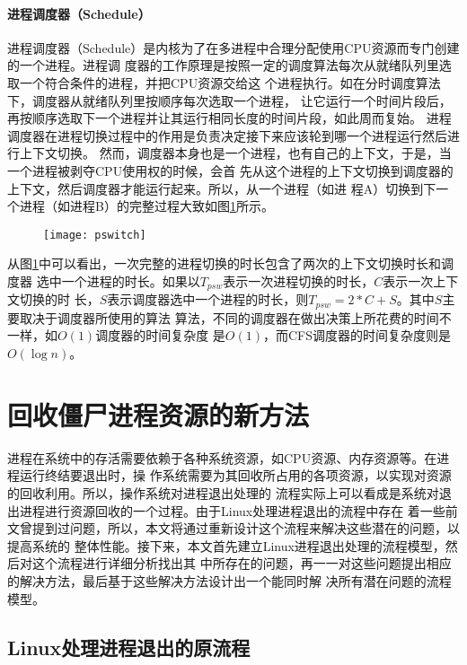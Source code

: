 \documentclass{swfuthesism}
\begin{document}
\subsubsection{进程调度器（Schedule）}

进程调度器（Schedule）是内核为了在多进程中合理分配使用CPU资源而专门创建的一个进程。进程调
度器的工作原理是按照一定的调度算法每次从就绪队列里选取一个符合条件的进程，并把CPU资源交给这
个进程执行\cite{rusling99tlk}。如在分时调度算法下，调度器从就绪队列里按顺序每次选取一个进程，
让它运行一个时间片段后，再按顺序选取下一个进程并让其运行相同长度的时间片段，如此周而复始。
进程调度器在进程切换过程中的作用是负责决定接下来应该轮到哪一个进程运行然后进行上下文切换。
然而，调度器本身也是一个进程，也有自己的上下文，于是，当一个进程被剥夺CPU使用权的时候，会首
先从这个进程的上下文切换到调度器的上下文，然后调度器才能运行起来。所以，从一个进程（如进
程A）切换到下一个进程（如进程B）的完整过程大致如图\ref{fig:sched5}所示。

\begin{figure}[hb]
  \centering
  \texttt{[image: pswitch]}
  \label{fig:sched5}
\end{figure}

从图\ref{fig:sched5}中可以看出，一次完整的进程切换的时长包含了两次的上下文切换时长和调度器
选中一个进程的时长。如果以$T_{psw}$表示一次进程切换的时长，$C$表示一次上下文切换的时
长，$S$表示调度器选中一个进程的时长，则$T_{psw}=2*C+S$。其中$S$主要取决于调度器所使用的算法
算法，不同的调度器在做出决策上所花费的时间不一样，如$O(1)$调度器的时间复杂度
是$O(1)$\cite{wiki:o1s}，而CFS调度器的时间复杂度则是$O(\log n)$\cite{wiki:cfs}。

\chapter{回收僵尸进程资源的新方法}

进程在系统中的存活需要依赖于各种系统资源，如CPU资源、内存资源等。在进程运行终结要退出时，操
作系统需要为其回收所占用的各项资源，以实现对资源的回收利用。所以，操作系统对进程退出处理的
流程实际上可以看成是系统对退出进程进行资源回收的一个过程。由于Linux处理进程退出的流程中存在
着一些前文曾提到过问题，所以，本文将通过重新设计这个流程来解决这些潜在的问题，以提高系统的
整体性能。接下来，本文首先建立Linux进程退出处理的流程模型，然后对这个流程进行详细分析找出其
中所存在的问题，再一一对这些问题提出相应的解决方法，最后基于这些解决方法设计出一个能同时解
决所有潜在问题的流程模型。

\section{Linux处理进程退出的原流程}
\label{sec:workflow}
\end{document}

